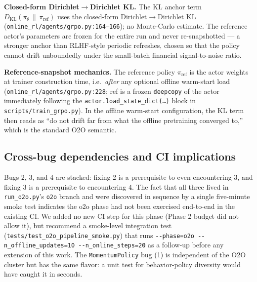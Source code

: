 \textbf{Closed-form Dirichlet$\to$Dirichlet KL.} The KL anchor term
$D_{\mathrm{KL}}(\pi_\theta \,\|\, \pi_{\text{ref}})$ uses the
closed-form Dirichlet$\to$Dirichlet KL
(\texttt{online\_rl/agents/grpo.py:164--166}); no Monte-Carlo
estimate. The reference actor's parameters are frozen for the entire
run and never re-snapshotted --- a stronger anchor than RLHF-style
periodic refreshes, chosen so that the policy cannot drift unboundedly
under the small-batch financial signal-to-noise ratio.

\textbf{Reference-snapshot mechanics.} The reference policy
$\pi_{\text{ref}}$ is the actor weights at trainer construction time,
i.e.\ \emph{after} any optional offline warm-start load
(\texttt{online\_rl/agents/grpo.py:228}; ref is a frozen
\texttt{deepcopy} of the actor immediately following the
\texttt{actor.load\_state\_dict(\dots)} block in
\texttt{scripts/train\_grpo.py}). In the offline warm-start
configuration, the KL term then reads as ``do not drift far from what
the offline pretraining converged to,'' which is the standard O2O
semantic.

\subsection{Cross-bug dependencies and CI implications}
\label{app:impl:ci}

Bugs 2, 3, and 4 are stacked: fixing 2 is a prerequisite to even
encountering 3, and fixing 3 is a prerequisite to encountering 4. The
fact that all three lived in \texttt{run\_o2o.py}'s \texttt{o2o} branch
and were discovered in sequence by a single five-minute smoke test
indicates the o2o phase had not been exercised end-to-end in the
existing CI. We added no new CI step for this phase (Phase 2 budget did
not allow it), but recommend a smoke-level integration test
(\texttt{tests/test\_o2o\_pipeline\_smoke.py}) that runs
\texttt{-{}-phase=o2o -{}-n\_offline\_updates=10 -{}-n\_online\_steps=20}
as a follow-up before any extension of this work. The
\texttt{MomentumPolicy} bug (1) is independent of the O2O cluster but
has the same flavor: a unit test for behavior-policy diversity would
have caught it in seconds.

